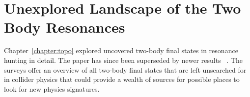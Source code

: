 %
%
%
%



\section{Unexplored Landscape of the Two Body Resonances}
Chapter~\ref{chapter:topo} explored uncovered two-body final states in resonance hunting in detail. The paper has since been superseded by newer results ~\cite{2020}. The surveys offer an overview of all two-body final states that are left unsearched for in collider physics that could provide a wealth of sources for possible places to look for new physics signatures.

